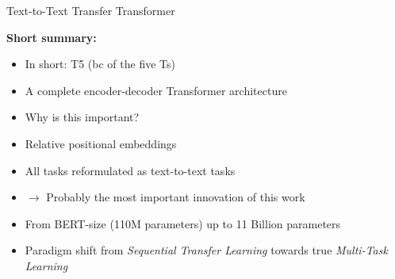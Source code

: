 \begin{frame}{Text-to-Text Transfer Transformer}

\vfill

	\textbf{Short summary:}

	\begin{itemize}
		\item In short: T5 (bc of the five Ts)
		\item A complete encoder-decoder Transformer architecture
		\item[] \ques Why is this important?
		\item Relative positional embeddings
		\item All tasks reformulated as text-to-text tasks
		\item[] $\to$ Probably the most important innovation of this work
		\item From BERT-size (110M parameters) up to 11 Billion parameters
		\item Paradigm shift from \textit{Sequential Transfer Learning} towards true \textit{Multi-Task Learning}
	\end{itemize}
	
	\vspace{.5cm}

	\begin{center}
		\href{https://1.bp.blogspot.com/-o4oiOExxq1s/Xk26XPC3haI/AAAAAAAAFU8/NBlvOWB84L0PTYy9TzZBaLf6fwPGJTR0QCLcBGAsYHQ/s1600/image3.gif}{\textbf{}}
	\end{center}
	
\vfill

\end{frame}


